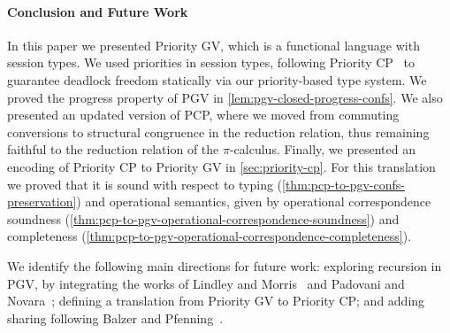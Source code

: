 \documentclass[main.tex]{subfiles}
\begin{document}
\paragraph{Conclusion and Future Work}
In this paper we presented Priority GV, which is a functional language with session types. We used priorities in session types, following Priority CP~\cite{dardhagay18} to guarantee deadlock freedom statically via our priority-based type system. We proved the progress property of PGV in \cref{lem:pgv-closed-progress-confs}. We also presented an updated version of PCP, where we moved from commuting conversions to structural congruence in the reduction relation, thus remaining faithful to the reduction relation of the $\pi$-calculus. Finally, we presented an encoding of Priority CP to Priority GV in \cref{sec:priority-cp}. For this translation we proved that it is sound with respect to typing (\cref{thm:pcp-to-pgv-confs-preservation}) and operational semantics, given by operational correspondence soundness (\cref{thm:pcp-to-pgv-operational-correspondence-soundness}) and completeness (\cref{thm:pcp-to-pgv-operational-correspondence-completeness}).

We identify the following main directions for future work: exploring recursion in PGV, by integrating the works of Lindley and Morris~\cite{lindleymorris16} and Padovani and Novara~\cite{padovaninovara15}; defining a translation from Priority GV to Priority CP; and adding sharing following Balzer and Pfenning~\cite{balzerpfenning17}.
\end{document}
